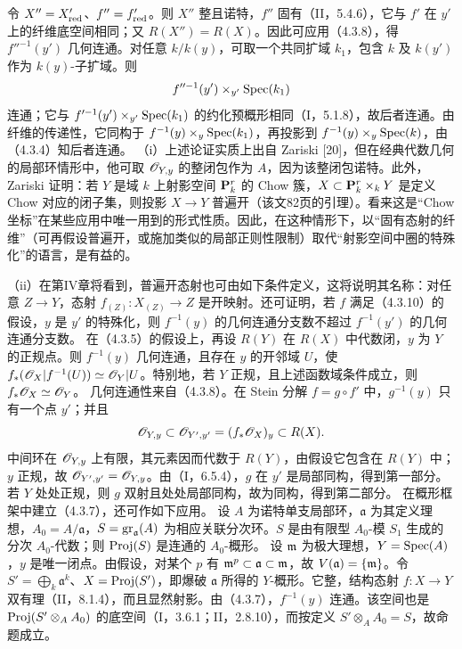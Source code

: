 令 $X''=X'_{\mathrm{red}}$、$f''=f'_{\mathrm{red}}$。则 $X''$ 整且诺特，$f''$ 固有（II，5.4.6），它与 $f'$ 在 $y'$ 上的纤维底空间相同；又 $R(X'')=R(X)$。因此可应用（4.3.8），得 $f''^{-1}(y')$ 几何连通。对任意 $k/k(y)$，可取一个共同扩域 $k_1$，包含 $k$ 及 $k(y')$ 作为 $k(y)$-子扩域。则
\[
f''^{-1}(y')\times_{y'}\operatorname{Spec}(k_1)
\]
连通；它与 $f'^{-1}(y')\times_{y'}\operatorname{Spec}(k_1)$ 的约化预概形相同（I，5.1.8），故后者连通。由纤维的传递性，它同构于 $f^{-1}(y)\times_y\operatorname{Spec}(k_1)$，再投影到 $f^{-1}(y)\times_y\operatorname{Spec}(k)$，由（4.3.4）知后者连通。\finishproof
{}
（i）上述论证实质上出自 Zariski [20]，但在经典代数几何的局部环情形中，他可取 $\mathscr O_{Y,y}$ 的整闭包作为 $A$，因为该整闭包诺特。此外，Zariski 证明：若 $Y$ 是域 $k$ 上射影空间 $\mathbf P_k^r$ 的 Chow 簇，$X\subset\mathbf P_k^r\times_kY$ 是定义 Chow 对应的闭子集，则投影 $X\to Y$ 普遍开（该文82页的引理）。看来这是“Chow 坐标”在某些应用中唯一用到的形式性质。因此，在这种情形下，以“固有态射的纤维”（可再假设普遍开，或施加类似的局部正则性限制）取代“射影空间中圈的特殊化”的语言，是有益的。

（ii）在第IV章将看到，普遍开态射也可由如下条件定义，这将说明其名称：对任意 $Z\to Y$，态射 $f_{(Z)}:X_{(Z)}\to Z$ 是开映射。还可证明，若 $f$ 满足（4.3.10）的假设，$y$ 是 $y'$ 的特殊化，则 $f^{-1}(y)$ 的几何连通分支数不超过 $f^{-1}(y')$ 的几何连通分支数。
在（4.3.5）的假设上，再设 $R(Y)$ 在 $R(X)$ 中代数闭，$y$ 为 $Y$ 的正规点。则 $f^{-1}(y)$ 几何连通，且存在 $y$ 的开邻域 $U$，使 $f_*(\mathscr O_X|f^{-1}(U))\simeq\mathscr O_Y|U$。特别地，若 $Y$ 正规，且上述函数域条件成立，则 $f_*\mathscr O_X\simeq\mathscr O_Y$。
\eproof
几何连通性来自（4.3.8）。在 Stein 分解 $f=g\circ f'$ 中，$g^{-1}(y)$ 只有一个点 $y'$；并且
\[
\mathscr O_{Y,y}\subset\mathscr O_{Y',y'}=(f_*\mathscr O_X)_y\subset R(X).
\]
中间环在 $\mathscr O_{Y,y}$ 上有限，其元素因而代数于 $R(Y)$，由假设它包含在 $R(Y)$ 中；$y$ 正规，故 $\mathscr O_{Y',y'}=\mathscr O_{Y,y}$。由（I，6.5.4），$g$ 在 $y'$ 是局部同构，得到第一部分。若 $Y$ 处处正规，则 $g$ 双射且处处局部同构，故为同构，得到第二部分。\finishproof
在概形框架中建立（4.3.7），还可作如下应用。
设 $A$ 为诺特单支局部环，$\mathfrak a$ 为其定义理想，$A_0=A/\mathfrak a$，$S=\operatorname{gr}_{\mathfrak a}(A)$ 为相应关联分次环。$S$ 是由有限型 $A_0$-模 $S_1$ 生成的分次 $A_0$-代数；则 $\operatorname{Proj}(S)$ 是连通的 $A_0$-概形。
\eproof
设 $\mathfrak m$ 为极大理想，$Y=\operatorname{Spec}(A)$，$y$ 是唯一闭点。由假设，对某个 $p$ 有 $\mathfrak m^p\subset\mathfrak a\subset\mathfrak m$，故 $V(\mathfrak a)=\{\mathfrak m\}$。令 $S'=\bigoplus_k\mathfrak a^k$、$X=\operatorname{Proj}(S')$，即爆破 $\mathfrak a$ 所得的 $Y$-概形。它整，结构态射 $f:X\to Y$ 双有理（II，8.1.4），而且显然射影。由（4.3.7），$f^{-1}(y)$ 连通。该空间也是 $\operatorname{Proj}(S'\otimes_AA_0)$ 的底空间（I，3.6.1；II，2.8.10），而按定义 $S'\otimes_AA_0=S$，故命题成立。\finishproof\par

